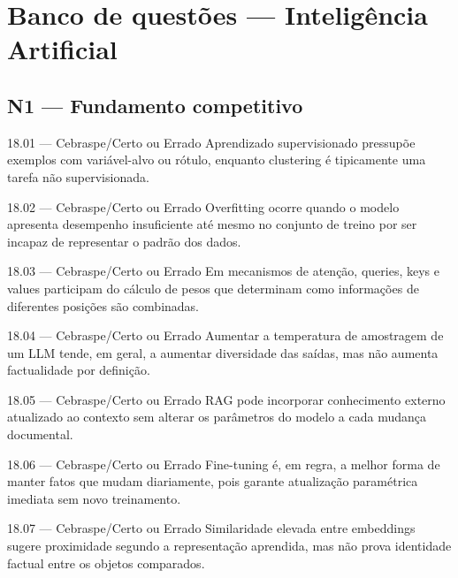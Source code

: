 \section{Banco de questões — Inteligência Artificial}

\subsection*{N1 — Fundamento competitivo}

\begin{questao}{ 18.01 — Cebraspe/Certo ou Errado}
Aprendizado supervisionado pressupõe exemplos com variável-alvo ou rótulo, enquanto clustering é tipicamente uma tarefa não supervisionada.
\end{questao}

\begin{questao}{ 18.02 — Cebraspe/Certo ou Errado}
Overfitting ocorre quando o modelo apresenta desempenho insuficiente até mesmo no conjunto de treino por ser incapaz de representar o padrão dos dados.
\end{questao}

\begin{questao}{ 18.03 — Cebraspe/Certo ou Errado}
Em mecanismos de atenção, queries, keys e values participam do cálculo de pesos que determinam como informações de diferentes posições são combinadas.
\end{questao}

\begin{questao}{ 18.04 — Cebraspe/Certo ou Errado}
Aumentar a temperatura de amostragem de um LLM tende, em geral, a aumentar diversidade das saídas, mas não aumenta factualidade por definição.
\end{questao}

\begin{questao}{ 18.05 — Cebraspe/Certo ou Errado}
RAG pode incorporar conhecimento externo atualizado ao contexto sem alterar os parâmetros do modelo a cada mudança documental.
\end{questao}

\begin{questao}{ 18.06 — Cebraspe/Certo ou Errado}
Fine-tuning é, em regra, a melhor forma de manter fatos que mudam diariamente, pois garante atualização paramétrica imediata sem novo treinamento.
\end{questao}

\begin{questao}{ 18.07 — Cebraspe/Certo ou Errado}
Similaridade elevada entre embeddings sugere proximidade segundo a representação aprendida, mas não prova identidade factual entre os objetos comparados.
\end{questao}

